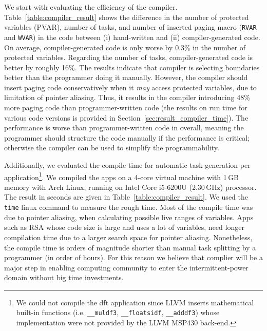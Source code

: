 We start with evaluating the efficiency of the \sys compiler. Table~\ref{table:compiler_result} shows the difference in the number of protected variables (PVAR), number of tasks, and number of inserted paging macro ({\tt RVAR} and {\tt WVAR}) in the code between (i) hand-written \sys and (ii) compiler-generated \sys code. On average, compiler-generated code is only worse by 0.3\% in the number of protected variables. Regarding the number of tasks, compiler-generated code is better by roughly 16\%. The results indicate that \sys compiler is selecting boundaries better than the programmer doing it manually. However, the \sys compiler should insert paging code conservatively when it {\em may} access protected variables, due to limitation of pointer aliasing. Thus, it results in the \sys compiler introducing 48\% more paging code than programmer-written code (the results on run time for various \sys code versions is provided in Section~\ref{sec:result_compiler_time}). The performance is worse than programmer-written \sys code in overall, meaning the programmer should structure the code manually if the performance is critical; otherwise the compiler can be used to simplify the programmability. 

Additionally, we evaluated the compile time for automatic task generation per application\footnote{We could not compile the dft application since LLVM inserts mathematical built-in functions (i.e. \texttt{\_\_muldf3}, \texttt{\_\_floatsidf}, \texttt{\_\_adddf3}) whose implementation were not provided by the LLVM MSP430 back-end.}. We compiled the apps on a 4-core virtual machine with 1\,GB memory with Arch Linux, running on Intel Core i5-6200U (2.30\,GHz) processor. The result in seconds are given in Table~\ref{table:compiler_result}. We used the {\tt time} linux command to measure the rough time. Most of the compile time was due to pointer aliasing, when calculating possible live ranges of variables. Apps such as RSA whose code size is large and uses a lot of variables, need longer compilation time due to a larger search space for pointer aliasing. Nonetheless, the compile time is orders of magnitude shorter than manual task splitting by a programmer (in  order of hours). For this reason we believe that \sys complier will be a major step in enabling computing community to enter the intermittent-power domain without big time investments.

%

